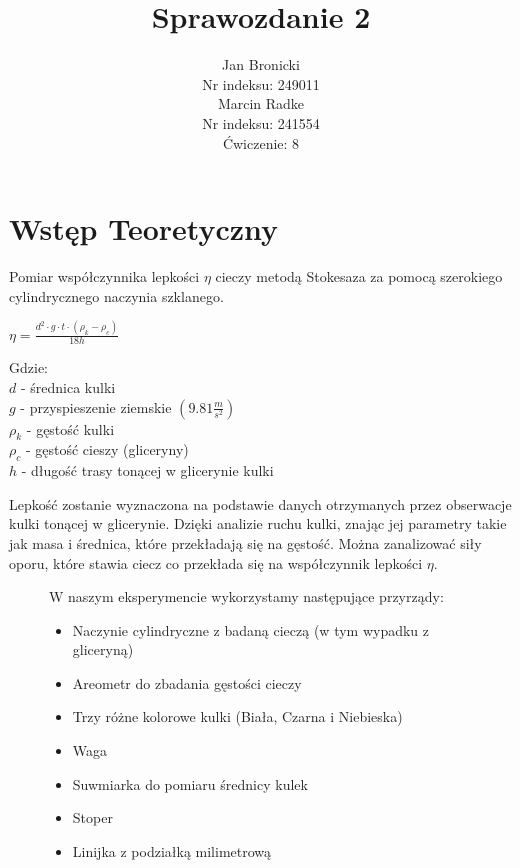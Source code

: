 \documentclass{article}
\title{Sprawozdanie 2}
\author{Jan Bronicki \\
Nr indeksu: 249011\\
Marcin Radke\\
Nr indeksu: 241554\\
Ćwiczenie: 8}
\date{}
\begin{document}
\maketitle
\section{Wstęp Teoretyczny}
\par Pomiar współczynnika lepkości $\eta$ cieczy metodą Stokesaza za pomocą 
szerokiego cylindrycznego 
naczynia szklanego. \\
\begin{center}
    $
    \eta=\frac{d^{2}\cdot g\cdot t\cdot (\rho_{k}-\rho_{c})}{18h}
    $
    \begin{flushleft}
        Gdzie:\\
        $d$ - średnica kulki\\
        $g$ - przyspieszenie ziemskie $(9.81\frac{m}{s^{2}})$\\
        $\rho_{k}$ - gęstość kulki\\
        $\rho_{c}$ - gęstość cieszy (gliceryny)\\
        $h$ - długość trasy tonącej w glicerynie kulki
    \end{flushleft}
\end{center}
\par Lepkość zostanie wyznaczona na podstawie danych otrzymanych przez obserwacje kulki 
tonącej w glicerynie. Dzięki analizie ruchu kulki, znając jej parametry takie 
jak masa i średnica, które przekładają się na gęstość. Można zanalizować siły oporu,
które stawia ciecz co przekłada się na współczynnik lepkości $\eta$.
\vspace{5ex}
\begin{figure}[h!]
    W naszym eksperymencie wykorzystamy następujące przyrządy:
    \begin{itemize}
        \item Naczynie cylindryczne z badaną cieczą (w tym wypadku z gliceryną)
        \item Areometr do zbadania gęstości cieczy
        \item Trzy różne kolorowe kulki (Biała, Czarna i Niebieska)
        \item Waga
        \item Suwmiarka do pomiaru średnicy kulek
        \item Stoper
        \item Linijka z podziałką milimetrową
    \end{itemize}


\end{figure}
\end{document}
